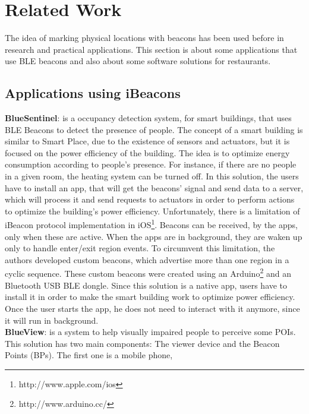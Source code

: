 
\section{Related Work}
\label{sec:related_work}
The idea of marking physical locations with beacons has been used before
in research and practical applications.
This section is about some applications that use BLE beacons and also
about some software solutions for restaurants.

\subsection{Applications using iBeacons}
\label{sub:applications_using_ibeacons}
\textbf{BlueSentinel}\cite{bluesentinel}: is a
occupancy detection system, for smart buildings,
that uses BLE Beacons to detect the presence of
people. The concept of a smart building
is similar to Smart Place,
due to the existence of sensors and actuators, but
it is focused on the power efficiency of the
building. The idea is to optimize energy
consumption according to people's presence.
For instance, if there are no people in a given room,
the heating system can be turned off.
In this solution, the users have to install
an app, that will get the beacons' signal and
send data to a server, which will process it
and send requests to actuators in order to
perform actions to optimize the
building's power efficiency.
Unfortunately, there is a limitation
of iBeacon protocol implementation
in iOS\footnote{http://www.apple.com/ios}.
Beacons can be received, by the apps,
only when these are active. When the apps are in
background, they are waken up only to handle
enter/exit region events. To circumvent this
limitation, the authors developed custom
beacons, which advertise more than one region
in a cyclic sequence. These custom beacons
were created using an
Arduino\footnote{http://www.arduino.cc/}
and an Bluetooth USB BLE dongle.
Since this solution is a native app,
users have to install it in order
to make the smart building work to
optimize power efficiency.
Once the user starts the app, he does not
need to interact with it anymore, since it
will run in background.
\\
\textbf{BlueView}\cite{blueview}: is a system to help
visually impaired people to perceive some POIs.
This solution has two main components: The viewer device
and the Beacon Points (BPs). The first one is a mobile phone,
